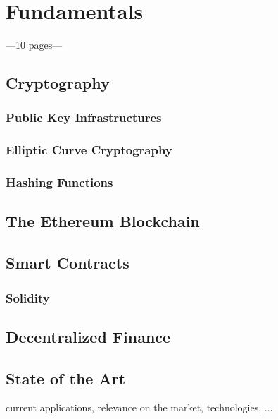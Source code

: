 \chapter{Fundamentals}
\label{cha:Fundamentals}

---10 pages---

\section{Cryptography}
\subsection{Public Key Infrastructures}
\subsection{Elliptic Curve Cryptography}
\subsection{Hashing Functions}
\section{The Ethereum Blockchain}
\section{Smart Contracts}
\subsection{Solidity}
\section{Decentralized Finance}
\section{State of the Art}
current applications, relevance on the market, technologies, ...